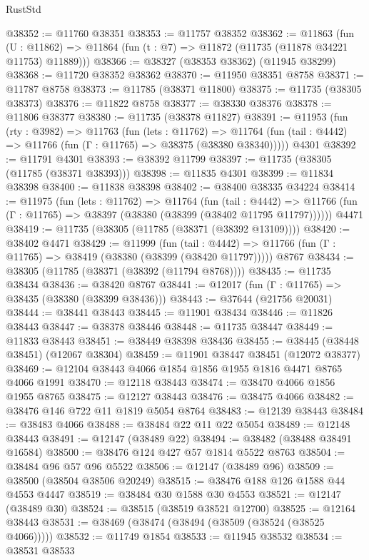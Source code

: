 \begin{lexlean}{RustStd}
\begin{coremodule}
@38352 := @11760 @38351
@38353 := @11757 @38352
@38362 := @11863
    (fun (U : @11862) => @11864 (fun (t : @7) => @11872 (@11735 (@11878 @34221 @11753) @11889)))
@38366 := @38327 (@38353 @38362) (@11945 @38299)
@38368 := @11720 @38352 @38362
@38370 := @11950 @38351 @8758
@38371 := @11787 @8758
@38373 := @11785 (@38371 @11800)
@38375 := @11735 (@38305 @38373)
@38376 := @11822 @8758
@38377 := @38330 @38376
@38378 := @11806 @38377
@38380 := @11735 (@38378 @11827)
@38391 := @11953
    (fun (rty : @3982) =>
    @11763
      (fun (lets : @11762) =>
      @11764 (fun (tail : @4442) => @11766 (fun (Γ : @11765) => @38375 (@38380 @38340)))))
    @4301
@38392 := @11791 @4301
@38393 := @38392 @11799
@38397 := @11735 (@38305 (@11785 (@38371 @38393)))
@38398 := @11835 @4301
@38399 := @11834 @38398
@38400 := @11838 @38398
@38402 := @38400 @38335 @34224
@38414 := @11975
    (fun (lets : @11762) =>
    @11764
      (fun (tail : @4442) =>
      @11766 (fun (Γ : @11765) => @38397 (@38380 (@38399 (@38402 @11795 @11797))))))
    @4471
@38419 := @11735 (@38305 (@11785 (@38371 (@38392 @13109))))
@38420 := @38402 @4471
@38429 := @11999
    (fun (tail : @4442) => @11766 (fun (Γ : @11765) => @38419 (@38380 (@38399 (@38420 @11797)))))
    @8767
@38434 := @38305 (@11785 (@38371 (@38392 (@11794 @8768))))
@38435 := @11735 @38434
@38436 := @38420 @8767
@38441 := @12017 (fun (Γ : @11765) => @38435 (@38380 (@38399 @38436)))
@38443 := @37644 (@21756 @20031)
@38444 := @38441 @38443
@38445 := @11901 @38434
@38446 := @11826 @38443
@38447 := @38378 @38446
@38448 := @11735 @38447
@38449 := @11833 @38443
@38451 := @38449 @38398 @38436
@38455 := @38445 (@38448 @38451) (@12067 @38304)
@38459 := @11901 @38447 @38451 (@12072 @38377)
@38469 := @12104 @38443 @4066 @1854 @1856 @1955 @1816 @4471 @8765 @4066 @1991
@38470 := @12118 @38443
@38474 := @38470 @4066 @1856 @1955 @8765
@38475 := @12127 @38443
@38476 := @38475 @4066
@38482 := @38476 @146 @722 @11 @1819 @5054 @8764
@38483 := @12139 @38443
@38484 := @38483 @4066
@38488 := @38484 @22 @11 @22 @5054
@38489 := @12148 @38443
@38491 := @12147 (@38489 @22)
@38494 := @38482 (@38488 @38491 @16584)
@38500 := @38476 @124 @427 @57 @1814 @5522 @8763
@38504 := @38484 @96 @57 @96 @5522
@38506 := @12147 (@38489 @96)
@38509 := @38500 (@38504 @38506 @20249)
@38515 := @38476 @188 @126 @1588 @44 @4553 @4447
@38519 := @38484 @30 @1588 @30 @4553
@38521 := @12147 (@38489 @30)
@38524 := @38515 (@38519 @38521 @12700)
@38525 := @12164 @38443
@38531 := @38469 (@38474 (@38494 (@38509 (@38524 (@38525 @4066)))))
@38532 := @11749 @1854
@38533 := @11945 @38532
@38534 := @38531 @38533

\end{coremodule}
\end{lexlean}

